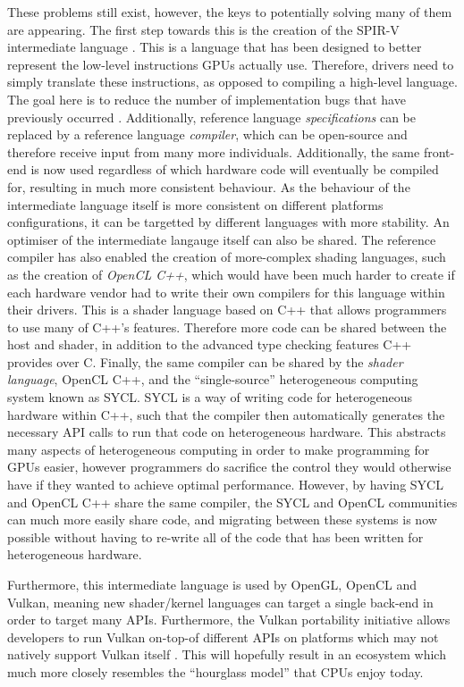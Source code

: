 \documentclass[a4paper,12pt,twoside,openright]{report}
\begin{document}
These problems still exist, however, the keys to potentially solving many of
them are appearing. The first step towards this is the creation of the SPIR-V
intermediate language \cite{SPIRV}. This is a language that has been designed
to better represent the low-level instructions GPUs actually use. Therefore,
drivers need to simply translate these instructions, as opposed to compiling a
high-level language. The goal here is to reduce the number of implementation
bugs that have previously occurred \cite{TODO}. Additionally, reference
language \textit{specifications} can be replaced by a reference language
\textit{compiler}, which can be open-source and therefore receive input from
many more individuals. Additionally, the same front-end is now used regardless
of which hardware code will eventually be compiled for, resulting in much more
consistent behaviour. As the behaviour of the intermediate language itself is
more consistent on different platforms configurations, it can be targetted by
different languages with more stability. An optimiser of the intermediate
langauge itself can also be shared. The reference compiler has also enabled the
creation of more-complex shading languages, such as the creation of
\textit{OpenCL C++}, which would have been much harder to create if each
hardware vendor had to write their own compilers for this language within their
drivers. This is a shader language based on C++ that allows programmers to use
many of C++'s features. Therefore more code can be shared between the host and
shader, in addition to the advanced type checking features C++ provides over C.
Finally, the same compiler can be shared by the \textit{shader language},
OpenCL C++, and the ``single-source'' heterogeneous computing system known as
SYCL. SYCL is a way of writing code for heterogeneous hardware within C++, such
that the compiler then automatically generates the necessary API calls to run
that code on heterogeneous hardware. This abstracts many aspects of
heterogeneous computing in order to make programming for GPUs easier, however
programmers do sacrifice the control they would otherwise have if they wanted
to achieve optimal performance. However, by having SYCL and OpenCL C++ share
the same compiler, the SYCL and OpenCL communities can much more easily share
code, and migrating between these systems is now possible without having to
re-write all of the code that has been written for heterogeneous hardware.

Furthermore, this intermediate language is used by OpenGL, OpenCL and Vulkan,
meaning new shader/kernel languages can target a single back-end in order to
target many APIs. Furthermore, the Vulkan portability initiative allows
developers to run Vulkan on-top-of different APIs on platforms which may not
natively support Vulkan itself \cite{TODO}. This will hopefully result in an
ecosystem which much more closely resembles the ``hourglass model'' that CPUs
enjoy today. %
\end{document}
